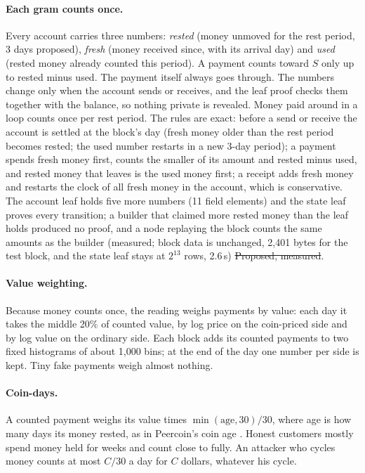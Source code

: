 \paragraph{Each gram counts once.} Every account carries three numbers: \emph{rested} (money unmoved for the rest period, 3 days proposed), \emph{fresh} (money received since, with its arrival day) and \emph{used} (rested money already counted this period). A payment counts toward $S$ only up to rested minus used. The payment itself always goes through. The numbers change only when the account sends or receives, and the leaf proof checks them together with the balance, so nothing private is revealed. Money paid around in a loop counts once per rest period. The rules are exact: before a send or receive the account is settled at the block's day (fresh money older than the rest period becomes rested; the used number restarts in a new 3-day period); a payment spends fresh money first, counts the smaller of its amount and rested minus used, and rested money that leaves is the used money first; a receipt adds fresh money and restarts the clock of all fresh money in the account, which is conservative. The account leaf holds five more numbers (11 field elements) and the state leaf proves every transition; a builder that claimed more rested money than the leaf holds produced no proof, and a node replaying the block counts the same amounts as the builder (measured; block data is unchanged, 2,401 bytes for the test block, and the state leaf stays at $2^{13}$ rows, 2.6\,s) \st{Proposed, measured}.

\paragraph{Value weighting.} Because money counts once, the reading weighs payments by value: each day it takes the middle 20\% of counted value, by log price on the coin-priced side and by log value on the ordinary side. Each block adds its counted payments to two fixed histograms of about 1,000 bins; at the end of the day one number per side is kept. Tiny fake payments weigh almost nothing.

\paragraph{Coin-days.} A counted payment weighs its value times $\min(\text{age},30)/30$, where age is how many days its money rested, as in Peercoin's coin age \cite{peercoin}. Honest customers mostly spend money held for weeks and count close to fully. An attacker who cycles money counts at most $C/30$ a day for $C$ dollars, whatever his cycle.

